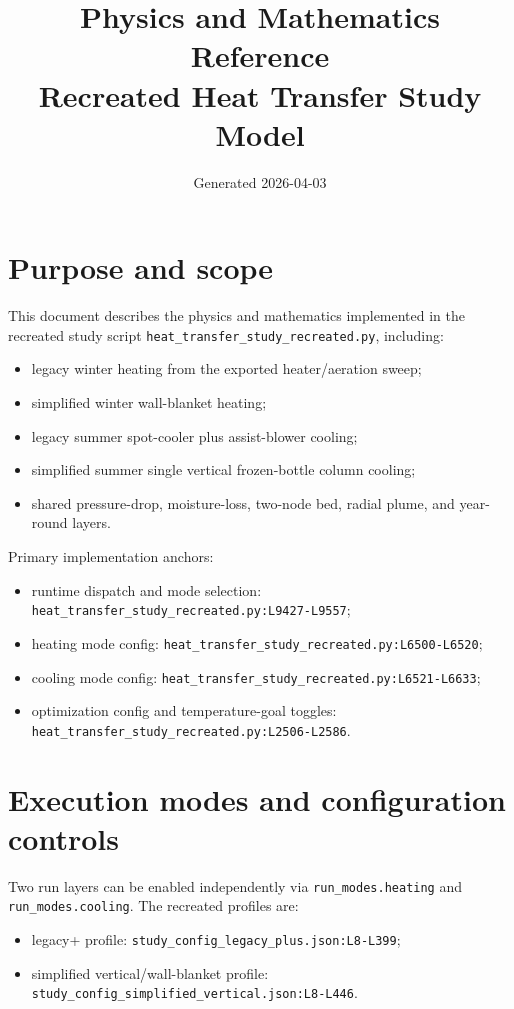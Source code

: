 \documentclass[11pt]{article}
\title{Physics and Mathematics Reference\\Recreated Heat Transfer Study Model}
\date{Generated 2026-04-03}
\newcommand{\srcref}[1]{\nolinkurl{#1}}
\newcommand{\code}[1]{\nolinkurl{#1}}
\begin{document}
\maketitle

\section{Purpose and scope}
This document describes the physics and mathematics implemented in the recreated study script
\srcref{heat_transfer_study_recreated.py}, including:
\begin{itemize}[leftmargin=*]
\item legacy winter heating from the exported heater/aeration sweep;
\item simplified winter wall-blanket heating;
\item legacy summer spot-cooler plus assist-blower cooling;
\item simplified summer single vertical frozen-bottle column cooling;
\item shared pressure-drop, moisture-loss, two-node bed, radial plume, and year-round layers.
\end{itemize}

Primary implementation anchors:
\begin{itemize}[leftmargin=*]
\item runtime dispatch and mode selection: \srcref{heat_transfer_study_recreated.py:L9427-L9557};
\item heating mode config: \srcref{heat_transfer_study_recreated.py:L6500-L6520};
\item cooling mode config: \srcref{heat_transfer_study_recreated.py:L6521-L6633};
\item optimization config and temperature-goal toggles: \srcref{heat_transfer_study_recreated.py:L2506-L2586}.
\end{itemize}

\section{Execution modes and configuration controls}
Two run layers can be enabled independently via \code{run\_modes.heating} and \code{run\_modes.cooling}.
The recreated profiles are:
\begin{itemize}[leftmargin=*]
\item legacy+ profile:
\srcref{study_config_legacy_plus.json:L8-L399};
\item simplified vertical/wall-blanket profile:
\srcref{study_config_simplified_vertical.json:L8-L446}.
\end{itemize}
\end{document}
